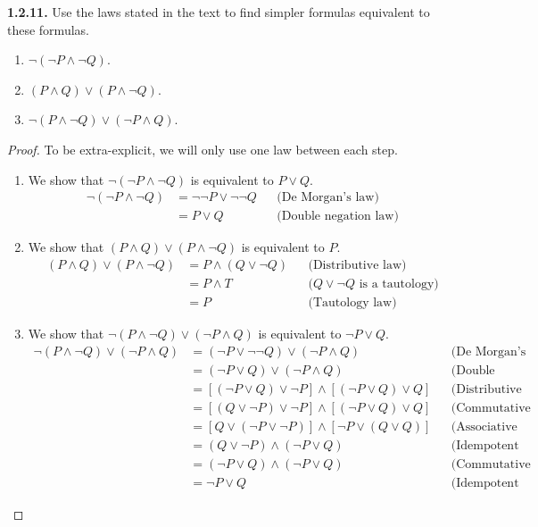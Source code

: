 \documentclass[12pt]{amsart}
\newenvironment{statement}[1]{\smallskip\noindent\color[rgb]{.6627, .3529, .6314} {\bf #1.}}{}
\theoremstyle{definition}
\theoremstyle{remark}
\begin{document}
\begin{statement}{1.2.11}
Use the laws stated in the text to find simpler formulas equivalent to these formulas.
\begin{enumerate}
	\item $\neg (\neg P \wedge \neg Q)$.
	\item $(P \wedge Q) \vee (P \wedge \neg Q)$.
	\item $\neg (P \wedge \neg Q) \vee (\neg P \wedge Q)$.
\end{enumerate}
\end{statement}

\begin{proof}
To be extra-explicit, we will only use one law between each step.
\begin{enumerate}
	\item We show that $\neg (\neg P \wedge \neg Q)$ is equivalent to $P \vee Q$.
	\begin{align*}
		\neg (\neg P \wedge \neg Q) 
		&= \neg \neg P \vee \neg \neg Q && \text{(De Morgan's law)} \\
		&= P \vee Q && \text{(Double negation law)}
	\end{align*}
	
	\item We show that $(P \wedge Q) \vee (P \wedge \neg Q)$ is equivalent to $P$.
	\begin{align*}
		(P \wedge Q) \vee (P \wedge \neg Q)
		&= P \wedge (Q \vee \neg Q) && \text{(Distributive law)} \\
		&= P \wedge T && \text{($Q \vee \neg Q$ is a tautology)} \\
		&= P && \text{(Tautology law)}
	\end{align*}
	
	\item We show that $\neg (P \wedge \neg Q) \vee (\neg P \wedge Q)$ is equivalent to $\neg P \vee Q$.
	\begin{align*}
		\neg (P \wedge \neg Q) \vee (\neg P \wedge Q)
		&= (\neg P \vee \neg \neg Q) \vee (\neg P \wedge Q) && \text{(De Morgan's law)} \\
		&= (\neg P \vee Q) \vee (\neg P \wedge Q) && \text{(Double negation law)} \\
		&= [(\neg P \vee Q) \vee \neg P] \wedge [(\neg P \vee Q) \vee Q] 
		&& \text{(Distributive law)} \\
		&= [(Q \vee \neg P) \vee \neg P] \wedge [(\neg P \vee Q) \vee Q] 
		&& \text{(Commutative law)} \\
		&= [Q \vee (\neg P \vee \neg P)] \wedge [\neg P \vee (Q \vee Q)]
		&& \text{(Associative law)} \\
		&= (Q \vee \neg P) \wedge (\neg P \vee Q) && \text{(Idempotent law)} \\
		&= (\neg P \vee Q) \wedge (\neg P \vee Q) && \text{(Commutative law)} \\
		&= \neg P \vee Q && \text{(Idempotent law)}
	\end{align*}
\end{enumerate}
\end{proof}
\end{document}
